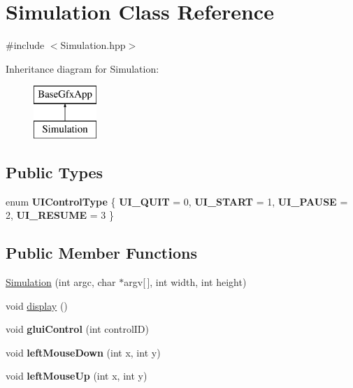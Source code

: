 \hypertarget{classSimulation}{\section{Simulation Class Reference}
\label{classSimulation}
}


{\ttfamily \#include $<$Simulation.\-hpp$>$}

Inheritance diagram for Simulation\-:\begin{figure}[H]
\begin{center}
\leavevmode
\includegraphics[height=2.000000cm]{classSimulation}
\end{center}
\end{figure}
\subsection*{Public Types}
\begin{DoxyCompactItemize}
\item 
enum {\bfseries U\-I\-Control\-Type} \{ {\bfseries U\-I\-\_\-\-Q\-U\-I\-T} = 0, 
{\bfseries U\-I\-\_\-\-S\-T\-A\-R\-T} = 1, 
{\bfseries U\-I\-\_\-\-P\-A\-U\-S\-E} = 2, 
{\bfseries U\-I\-\_\-\-R\-E\-S\-U\-M\-E} = 3
 \}
\end{DoxyCompactItemize}
\subsection*{Public Member Functions}
\begin{DoxyCompactItemize}
\item 
\hyperlink{classSimulation_a4c669ceaa34c7130966ce45f9de75fbe}{Simulation} (int argc, char $\ast$argv\mbox{[}$\,$\mbox{]}, int width, int height)
\item 
void \hyperlink{classSimulation_a449dcb7d97dfba99efe770de2f399c31}{display} ()
\item 
\hypertarget{classSimulation_a1607cd18e552ab9f4a6f57d362f7121a}{void {\bfseries glui\-Control} (int control\-I\-D)}\label{classSimulation_a1607cd18e552ab9f4a6f57d362f7121a}

\item 
\hypertarget{classSimulation_a786d1ba31d29937f0ac6f3ea88f8a607}{void {\bfseries left\-Mouse\-Down} (int x, int y)}\label{classSimulation_a786d1ba31d29937f0ac6f3ea88f8a607}

\item 
\hypertarget{classSimulation_a62ef254d85017074cd521a5787b5a234}{void {\bfseries left\-Mouse\-Up} (int x, int y)}\label{classSimulation_a62ef254d85017074cd521a5787b5a234}

\end{DoxyCompactItemize}
